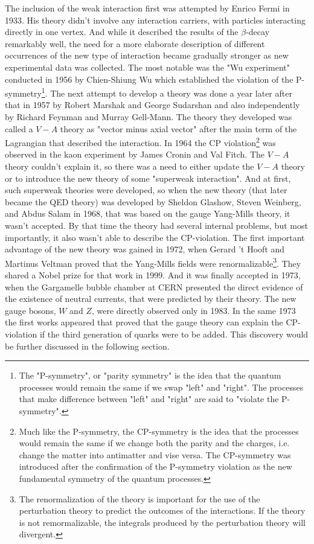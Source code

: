 The inclusion of the weak interaction first was attempted by Enrico Fermi in 1933. His theory didn't involve any interaction carriers, with particles interacting directly in one vertex. And while it described the results of the $\beta$-decay remarkably well, the need for a more elaborate description of different occurrences of the new type of interaction became gradually stronger as new experimental data was collected. The most notable was the "Wu experiment" conducted in 1956 by Chien-Shiung Wu which established the violation of the P-symmetry\footnote{The "P-symmetry", or "parity symmetry" is the idea that the quantum processes would remain the same if we swap "left" and "right". The processes that make difference between "left" and "right" are said to "violate the P-symmetry".}. The next attempt to develop a theory was done a year later after that in 1957 by Robert Marshak and George Sudarshan and also independently by Richard Feynman and Murray Gell-Mann. The theory they developed was called a $V-A$ theory as "vector minus axial vector" after the main term of the Lagrangian that described the interaction. In 1964 the CP violation\footnote{Much like the P-symmetry, the CP-symmetry is the idea that the processes would remain the same if we change both the parity and the charges, i.e. change the matter into antimatter and vise versa. The CP-symmetry was introduced after the confirmation of the P-symmetry violation as the new fundamental symmetry of the quantum processes.} was observed in the kaon experiment by James Cronin and Val Fitch. The $V-A$ theory couldn't explain it, so there was a need to either update the $V-A$ theory or to introduce the new theory of some "superweak interaction". And at first, such superweak theories were developed, so when the new theory (that later became the QED theory) was developed by Sheldon Glashow, Steven Weinberg, and Abdus Salam in 1968, that was based on the gauge Yang-Mills theory, it wasn't accepted. By that time the theory had several internal problems, but most importantly, it also wasn't able to describe the CP-violation. The first important advantage of the new theory was gained in 1972, when Gerard 't Hooft and Martinus Veltman proved that the Yang-Mills fields were renormalizable\footnote{The renormalization of the theory is important for the use of the perturbation theory to predict the outcomes of the interactions. If the theory is not remormalizable, the integrals produced by the perturbation theory will divergent.}. They shared a Nobel prize for that work in 1999. And it was finally accepted in 1973, when the Gargamelle bubble chamber at CERN presented the direct evidence of the existence of neutral currents, that were predicted by their theory. The new gauge bosons, $W$ and $Z$, were directly observed only in 1983. In the same 1973 the first works appeared that proved that the gauge theory can explain the CP-violation if the third generation of quarks were to be added. This discovery would be further discussed in the following section.

